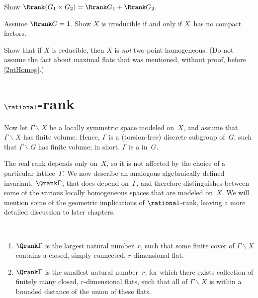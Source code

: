 \begin{exercises}

\item Show $\Rrank(G_1 \times G_2) = \Rrank G_1 + \Rrank G_2$.

\item Assume $\Rrank G = 1$. Show $X$ is irreducible if and only if
$X$~has no compact factors.

\item Show that if $X$ is reducible, then $X$ is \emph{not} two-point
homogeneous. (Do not assume the fact about maximal flats that
was mentioned, without proof, before \cref{2ptHomog}.)

 \end{exercises}





\section{\texorpdfstring{$\rational$}{Q}-rank} \label{QrankIntroSect}

Now let $\Gamma \backslash X$ be a locally symmetric space
modeled on~$X$, and assume that
$\Gamma \backslash X$ has
finite volume. Hence, $\Gamma$ is a (torsion-free) discrete subgroup
of~$G$, such that $\Gamma \backslash G$ has finite volume;
in short, $\Gamma$ is a  in~$G$.

The real rank depends only on~$X$, so it is not affected by the choice of
a particular lattice~$\Gamma$. We now describe an analogous
algebraically defined invariant, $\Qrank\Gamma$, that does depend
on~$\Gamma$, and therefore distinguishes between some of the various locally
homogeneous spaces that are modeled on~$X$. We will mention some of the
geometric implications of $\rational$-rank, leaving a more detailed
discussion to later chapters.

\begin{thm} \label{QrankFlats} \ 
\noprelistbreak
\begin{enumerate}
 \item \label{QrankFlats-exists}
 $\Qrank\Gamma$ is the largest natural number~$r$, such
that some finite cover of\/ $\Gamma \backslash X$ contains a closed, simply connected,
$r$-dimensional flat.
\item \label{QrankFlats-BddDist}
$\Qrank\Gamma$ is the smallest natural number~$r$, for which there
exists collection of finitely many closed, $r$-dimensional flats, such that all of\/ $\Gamma \backslash X$ is within a bounded distance of the union of these flats. 
\end{enumerate}
 \end{thm}

